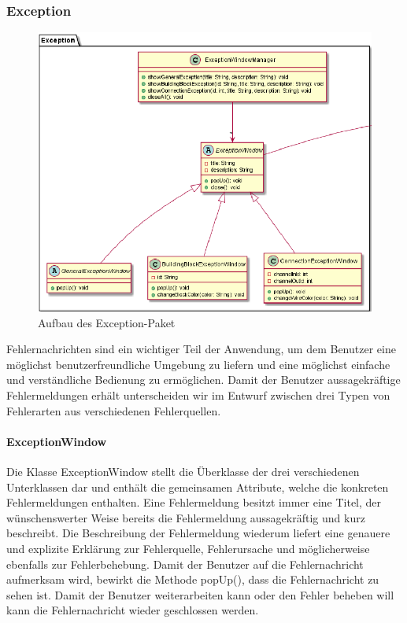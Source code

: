 \documentclass[parskip=full]{scrartcl}
\begin{document}
\newpage

\subsubsection{Exception}

\begin{figure}[htbp]
	\begin{center}
		\includegraphics[width = 14cm]{Grafiken/View/ExceptionNamespace.PNG}
		\caption{Aufbau des Exception-Paket}
		\label{Entwurf_Grob}
	\end{center}
\end{figure}

Fehlernachrichten sind ein wichtiger Teil der Anwendung, um dem Benutzer eine möglichst benutzerfreundliche Umgebung zu liefern und eine möglichst einfache und verständliche Bedienung zu ermöglichen. Damit der Benutzer aussagekräftige Fehlermeldungen erhält unterscheiden wir im Entwurf zwischen drei Typen von Fehlerarten aus verschiedenen Fehlerquellen.

\paragraph{ExceptionWindow}

Die Klasse ExceptionWindow stellt die Überklasse der drei verschiedenen Unterklassen dar und enthält die gemeinsamen Attribute, welche die konkreten Fehlermeldungen enthalten. Eine Fehlermeldung besitzt immer eine Titel, der wünschenswerter Weise bereits die Fehlermeldung aussagekräftig und kurz beschreibt. Die Beschreibung der Fehlermeldung wiederum liefert eine genauere und explizite Erklärung zur Fehlerquelle, Fehlerursache und möglicherweise ebenfalls zur Fehlerbehebung.
Damit der Benutzer auf die Fehlernachricht aufmerksam wird, bewirkt die Methode popUp(), dass die Fehlernachricht zu sehen ist. Damit der Benutzer weiterarbeiten kann oder den Fehler beheben will kann die Fehlernachricht wieder geschlossen werden.
\end{document}
